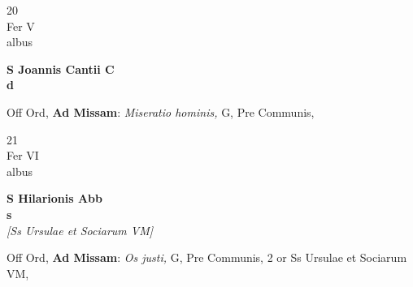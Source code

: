 \documentclass[10pt, openany]{book}
\begin{document}
        \begin{center}
            \begin{minipage}{3.5in}
                \vspace{2em}
                \begin{minipage}{0.5in}
                    {\Huge 20} \\
                    {\normalsize Fer V} \\
                    {\normalsize albus}
                \end{minipage}
                \begin{minipage}{3.0in}
                    \textbf{ \large S Joannis Cantii C \\
                    \textnormal{\normalsize d}} \\ 
                \end{minipage}
                \begin{justify}Off Ord, \textbf{Ad Missam}: \textit{Miseratio hominis,} G, Pre Communis,  
                \end{justify}
            \end{minipage}
        \end{center}
    
        \begin{center}
            \begin{minipage}{3.5in}
                \vspace{2em}
                \begin{minipage}{0.5in}
                    {\Huge 21} \\
                    {\normalsize Fer VI} \\
                    {\normalsize albus}
                \end{minipage}
                \begin{minipage}{3.0in}
                    \textbf{ \large S Hilarionis Abb \\
                    \textnormal{\normalsize s}} \\ \textit{[Ss Ursulae et Sociarum VM]} \\ 
                \end{minipage}
                \begin{justify}Off Ord, \textbf{Ad Missam}: \textit{Os justi,} G, Pre Communis, 2 or Ss Ursulae et Sociarum VM,  
                \end{justify}
            \end{minipage}
        \end{center}
    
\end{document}
